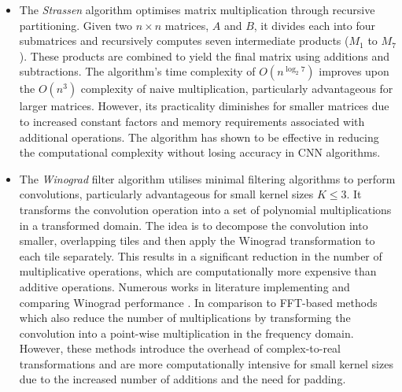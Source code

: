\begin{itemize}
    \item The \textit{Strassen}\cite{STRASSEN1969} algorithm optimises matrix multiplication through recursive partitioning. Given two \(n \times n\) matrices, \(A\) and \(B\), it divides each into four submatrices and recursively computes seven intermediate products (\(M_1\) to \(M_7\)). These products are combined to yield the final matrix using additions and subtractions. The algorithm's time complexity of \(O(n^{\log_2{7}})\) improves upon the \(O(n^3)\) complexity of naive multiplication, particularly advantageous for larger matrices. However, its practicality diminishes for smaller matrices due to increased constant factors and memory requirements associated with additional operations. The algorithm has shown to be effective in reducing the computational complexity without losing accuracy in CNN algorithms\cite{ZhaWanWan18}. 

    \item The \textit{Winograd}\cite{winograd1980arithmetic} filter algorithm utilises minimal filtering algorithms to perform convolutions, particularly advantageous for small kernel sizes \( K \leq 3 \). It transforms the convolution operation into a set of polynomial multiplications in a transformed domain. The idea is to decompose the convolution into smaller, overlapping tiles and then apply the Winograd transformation to each tile separately. This results in a significant reduction in the number of multiplicative operations, which are computationally more expensive than additive operations. Numerous works in literature implementing and comparing Winograd performance \cite{Lavin2015FastAF, YepKo20}. In comparison to FFT-based methods which also reduce the number of multiplications by transforming the convolution into a point-wise multiplication in the frequency domain. However, these methods introduce the overhead of complex-to-real transformations and are more computationally intensive for small kernel sizes due to the increased number of additions and the need for padding.
\end{itemize}

